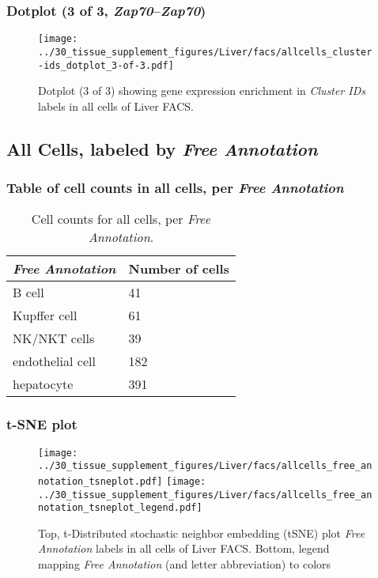 \clearpage

\subsubsection{Dotplot (3 of 3, \emph{Zap70}--\emph{Zap70})}
\begin{figure}[h]
\centering
\texttt{[image: ../30\_tissue\_supplement\_figures/Liver/facs/allcells\_cluster-ids\_dotplot\_3-of-3.pdf]}

\caption{ Dotplot (3 of 3)  showing gene expression enrichment in \emph{Cluster IDs} labels in all cells of Liver FACS. }
\end{figure}


\clearpage

\subsection{All Cells, labeled by \emph{Free Annotation}}
\subsubsection{Table of cell counts in all cells, per \emph{Free Annotation}}\begin{table}[h]
\centering
\label{my-label}
\begin{tabular}{@{}ll@{}}
\toprule

\emph{Free Annotation}& Number of cells \\ \midrule
B cell & 41 \\

Kupffer cell & 61 \\

NK/NKT cells & 39 \\

endothelial cell & 182 \\

hepatocyte & 391 \\
\bottomrule
\end{tabular}
\caption{Cell counts for all cells, per \emph{Free Annotation}.}
\end{table}

\clearpage
\subsubsection{t-SNE plot}
\begin{figure}[h]
\centering
\texttt{[image: ../30\_tissue\_supplement\_figures/Liver/facs/allcells\_free\_annotation\_tsneplot.pdf]}
\texttt{[image: ../30\_tissue\_supplement\_figures/Liver/facs/allcells\_free\_annotation\_tsneplot\_legend.pdf]}
\caption{Top, t-Distributed stochastic neighbor embedding (tSNE) plot  \emph{Free Annotation} labels in all cells of Liver FACS. Bottom, legend mapping \emph{Free Annotation} (and letter abbreviation) to colors}
\end{figure}


